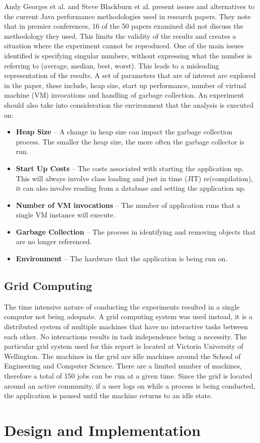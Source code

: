 \documentclass[11pt
              , a4paper
              , twoside
              , openright
              ]{report}
\begin{document}
Andy Georges et al. \cite{georges2007statistically} and Steve Blackburn et al. \cite{blackburn2008wake} present issues and alternatives to the current Java performance methodologies used in research papers. They note that in premier conferences, 16 of the 50 papers examined did not discuss the methodology they used. This limits the validity of the results and creates a situation where the experiment cannot be reproduced. One of the main issues identified is specifying singular numbers, without expressing what the number is referring to (average, median, best, worst). This leads to a misleading representation of the results. A set of parameters that are of interest are explored in the paper, these include, heap size, start up performance, number of virtual machine (VM) invocations and handling of garbage collection. An experiment should also take into consideration the environment that the analysis is executed on:
\begin{itemize}
\item \textbf{Heap Size} -- A change in heap size can impact the garbage collection process. The smaller the heap size, the more often the garbage collector is run.
\item \textbf{Start Up Costs}  -- The costs associated with starting the application up. This will always involve class loading and just in time (JIT) re(compilation), it can also involve reading from a database and setting the application up.
\item \textbf{Number of VM invocations} -- The number of application runs that a single VM instance will execute.
\item \textbf{Garbage Collection} -- The process in identifying and removing objects that are no longer referenced.
\item \textbf{Environment} -- The hardware that the application is being run on.
\end{itemize}

\section{Grid Computing}
The time intensive nature of conducting the experiments resulted in a single computer not being adequate. A grid computing system was used instead, it is a distributed system of multiple machines that have no interactive tasks between each other. No interactions results in task independence being a necessity. The particular grid system used for this report is located at Victoria University of Wellington. The machines in the grid are idle machines around the School of Engineering and Computer Science. There are a limited number of machines, therefore a total of 150 jobs can be run at a given time. Since the grid is located around an active community, if a user logs on while a process is being conducted, the application is paused until the machine returns to an idle state. \newpage 
 \newpage \chapter{Design and Implementation}\label{C:workdone}
\end{document}
